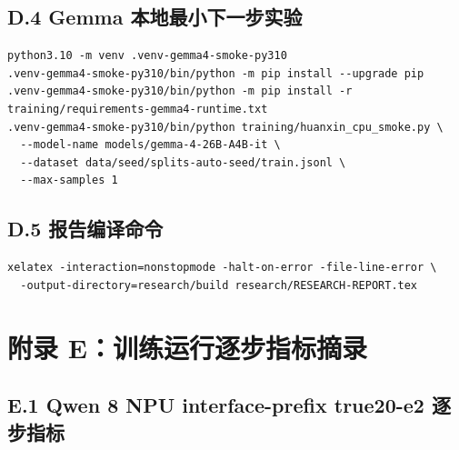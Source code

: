 \documentclass[11pt,a4paper]{article}
\begin{document}
\subsection{D.4 Gemma 本地最小下一步实验}

\begin{verbatim}
python3.10 -m venv .venv-gemma4-smoke-py310
.venv-gemma4-smoke-py310/bin/python -m pip install --upgrade pip
.venv-gemma4-smoke-py310/bin/python -m pip install -r training/requirements-gemma4-runtime.txt
.venv-gemma4-smoke-py310/bin/python training/huanxin_cpu_smoke.py \
  --model-name models/gemma-4-26B-A4B-it \
  --dataset data/seed/splits-auto-seed/train.jsonl \
  --max-samples 1
\end{verbatim}

\subsection{D.5 报告编译命令}

\begin{verbatim}
xelatex -interaction=nonstopmode -halt-on-error -file-line-error \
  -output-directory=research/build research/RESEARCH-REPORT.tex
\end{verbatim}

\clearpage

\section{附录 E：训练运行逐步指标摘录}

\subsection{E.1 Qwen 8 NPU interface-prefix true20-e2 逐步指标}
\end{document}

